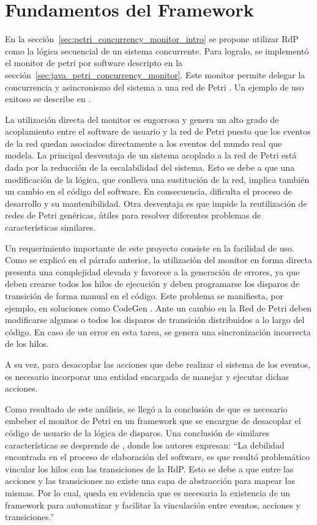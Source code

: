 \section{Fundamentos del Framework}
En la sección~\ref{sec:petri_concurrency_monitor_intro} se propone utilizar RdP
como la lógica secuencial de un sistema concurrente. Para logralo, se
implementó el monitor de petri por software descripto en la
sección~\ref{sec:java_petri_concurrency_monitor}.
Este monitor permite delegar la concurrencia y asincronismo del
sistema a una red de Petri \cite{TesisMicolini}. Un ejemplo de uso exitoso se
describe en \cite{Bentivegna-Ludemann}.

La utilización directa del monitor es engorrosa y genera un
alto grado de acoplamiento entre el software de usuario y la red de Petri
puesto que los eventos de la red quedan asociados directamente a los eventos del
mundo real que modela.
La principal desventaja de un sistema acoplado a la red de Petri está dada por la
reducción de la escalabilidad del sistema. Esto se debe a que una modificación
de la lógica, que conlleva una sustitución de la red, implica también un cambio
en el código del software. En consecuencia, dificulta el proceso de desarrollo y
su mantenibilidad. Otra desventaja es que impide la reutilización de redes de
Petri genéricas, útiles para resolver diferentes problemas de
características similares.

Un requerimiento importante de este proyecto consiste en la facilidad de uso.
Como se explicó en el párrafo anterior, la utilización del monitor en forma
directa presenta una complejidad elevada y favorece a la generación de errores,
ya que deben crearse todos los hilos de ejecución y deben programarse los disparos de
transición de forma manual en el código. Este problema se manifiesta, por
ejemplo, en soluciones como CodeGen \cite{codegen}.
Ante un cambio en la Red de Petri deben modificarse algunos o todos los
disparos de transición distribuidos a lo largo del código. En caso de un error
en esta tarea, se genera una sincronización incorrecta de los hilos.

A su vez, para desacoplar las acciones que debe realizar el sistema de los
eventos, es necesario incorporar una entidad encargada de manejar y ejecutar
dichas acciones.

Como resultado de este análisis, se llegó a la conclusión de que es necesario
embeber el monitor de Petri en un framework que se encargue de desacoplar el
código de usuario de la lógica de disparos.
Una conclusión de similares características se desprende de
\cite{Bentivegna-Ludemann}, donde los autores expresan: ``La debilidad
encontrada en el proceso de elaboración del software, es que resultó
problemático vincular los hilos con las transiciones de la RdP. Esto se debe a
que entre las acciones y las transiciones no existe una capa de abstracción
para mapear las mismas.
Por lo cual, queda en evidencia que es necesaria la existencia de un framework
para automatizar y facilitar la vinculación entre eventos, acciones y
transiciones.''


